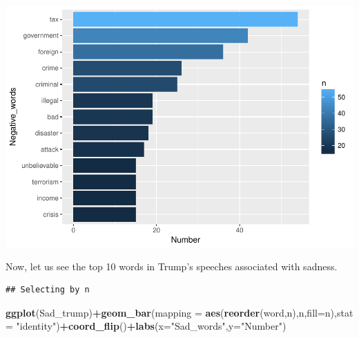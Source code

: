\documentclass[]{article}
\newenvironment{Shaded}{\begin{snugshade}}{\end{snugshade}}
\newcommand{\KeywordTok}[1]{\textcolor[rgb]{0.13,0.29,0.53}{\textbf{#1}}}
\newcommand{\DataTypeTok}[1]{\textcolor[rgb]{0.13,0.29,0.53}{#1}}
\newcommand{\DecValTok}[1]{\textcolor[rgb]{0.00,0.00,0.81}{#1}}
\newcommand{\StringTok}[1]{\textcolor[rgb]{0.31,0.60,0.02}{#1}}
\newcommand{\OperatorTok}[1]{\textcolor[rgb]{0.81,0.36,0.00}{\textbf{#1}}}
\newcommand{\NormalTok}[1]{#1}
\begin{document}
\includegraphics{Donald_Trump_Speech_sentiment_analysis_files/figure-latex/unnamed-chunk-32-1.pdf}

Now, let us see the top 10 words in Trump's speeches associated with
sadness.

\begin{Shaded}
\end{Shaded}

\begin{verbatim}
## Selecting by n
\end{verbatim}

\begin{Shaded}
\begin{Highlighting}[]
\KeywordTok{ggplot}\NormalTok{(Sad_trump)}\OperatorTok{+}\KeywordTok{geom_bar}\NormalTok{(}\DataTypeTok{mapping =} \KeywordTok{aes}\NormalTok{(}\KeywordTok{reorder}\NormalTok{(word,n),n,}\DataTypeTok{fill=}\NormalTok{n),}\DataTypeTok{stat =} \StringTok{"identity"}\NormalTok{)}\OperatorTok{+}\KeywordTok{coord_flip}\NormalTok{()}\OperatorTok{+}\KeywordTok{labs}\NormalTok{(}\DataTypeTok{x=}\StringTok{"Sad_words"}\NormalTok{,}\DataTypeTok{y=}\StringTok{"Number"}\NormalTok{)}
\end{Highlighting}
\end{Shaded}
\end{document}

